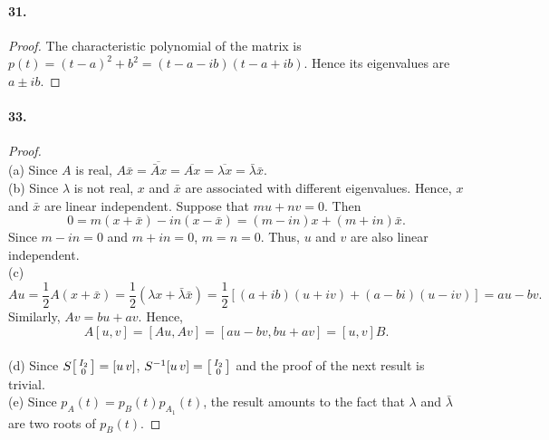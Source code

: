   \paragraph{31.}
  \begin{proof}
    The characteristic polynomial of the matrix is $p(t)=(t-a)^2+b^2=
    (t-a-ib)(t-a+ib)$. Hence its eigenvalues are $a\pm ib$.
  \end{proof}

  \paragraph{33.}
  \begin{proof}
    $\,$\\
    (a) Since $A$ is real, $A\bar{x} = \overline{\bar{A}x} = \overline{Ax} = 
    \overline{\lambda x} = \bar{\lambda}\bar{x}$.\\
    (b) Since $\lambda$ is not real, $x$ and $\bar{x}$ are associated with
    different eigenvalues. Hence, $x$ and $\bar{x}$ are linear independent.
    Suppose that $mu+nv=0$. Then
    \[
      0= m(x+\bar{x})-in(x-\bar{x}) = (m-in)x + (m+in)\bar{x}.
    \]
    Since $m-in=0$ and $m+in=0$, $m=n=0$. Thus, $u$ and $v$ are also linear 
    independent.\\
    (c) 
    \[
      Au = \frac{1}{2}A(x+\bar{x})=\frac{1}{2}(\lambda x+\bar{\lambda}\bar{x})
      = \frac{1}{2}[(a+ib)(u+iv)+(a-bi)(u-iv)] = au-bv.
    \]
    Similarly, $Av=bu+av$. Hence,
    \[
      A[u, v] = [Au, Av] = [au-bv, bu+av] = [u, v]B.
    \]\\
    (d) Since $S\begin{bsmallmatrix} I_2 \\ 0 \end{bsmallmatrix} = [u\,v]$, 
    $S^{-1}[u\,v]=\begin{bsmallmatrix} I_2 \\ 0 \end{bsmallmatrix}$ and the proof
    of the next result is trivial. \\
    (e) Since $p_A(t) = p_B(t)p_{A_1}(t)$, the result amounts to the fact that
    $\lambda$ and $\bar{\lambda}$ are two roots of $p_B(t)$.
  \end{proof}
  



